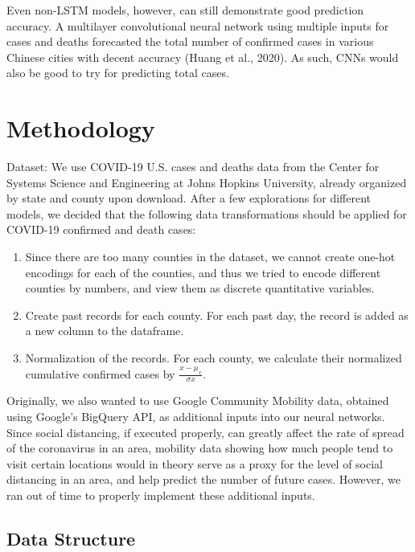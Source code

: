 ﻿\documentclass{article}
\begin{document}
\begin{multicols}{2}
Even non-LSTM models, however, can still demonstrate good prediction accuracy. A
multilayer convolutional neural network using multiple inputs for cases and
deaths forecasted the total number of confirmed cases in various Chinese cities
with decent accuracy (Huang et al., 2020). As such, CNNs would also be good to
try for predicting total cases.\\


\section*{Methodology}

Dataset: We use COVID-19 U.S. cases and deaths data from the Center for Systems
Science and Engineering at Johns Hopkins University, already organized by state
and county upon download. After a few explorations for different models, we
decided that the following data transformations should be applied for COVID-19
confirmed and death cases:

\begin{enumerate}
    \item Since there are too many counties in the dataset, we cannot create
    one-hot encodings for each of the counties, and thus we tried to encode
    different counties by numbers, and view them as discrete quantitative
    variables.

    \item Create past records for each county. For each past day, the record is
    added as a new column to the dataframe. 

    \item Normalization of the records. For each county, we calculate their
    normalized cumulative confirmed cases by $\frac{x-\mu_{x}}{\sigma{x}}$.
\end{enumerate}




Originally, we also wanted to use Google Community Mobility data, obtained using
Google’s BigQuery API, as additional inputs into our neural networks. Since
social distancing, if executed properly, can greatly affect the rate of spread
of the coronavirus in an area, mobility data showing how much people tend to
visit certain locations would in theory serve as a proxy for the level of social
distancing in an area, and help predict the number of future cases. However, we
ran out of time to properly implement these additional inputs.


\subsection*{Data Structure}


\end{multicols}
\end{document}
